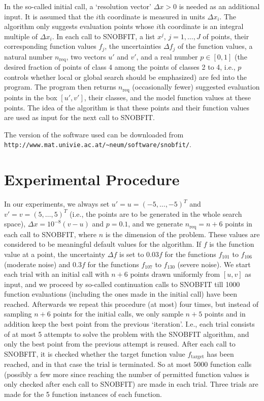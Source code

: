 \documentclass{sig-alternate}
\begin{document}
In the so-called
initial call, a `resolution vector' $\Delta x >0$ is needed as an additional input. It
is assumed that the $i$th coordinate is measured in units $\Delta x_i$. The algorithm
only suggests evaluation points whose $i$th coordinate is an integral multiple of
$\Delta x_i$. In each call to SNOBFIT, a list $x^j$, $j=1,\dots,J$ of points, their
corresponding function values $f_j$, the uncertainties $\Delta f_j$ of the function
values, a natural number $n_\text{req}$, two vectors $u'$ and $v'$, and a real number
$p \in [0,1]$ (the desired fraction of points of class 4 among the points of 
classes 2 to 4, i.e., $p$ controls whether local or global search should be 
emphasized) are fed into the program. The program then returns $n_\text{req}$
(occasionally fewer) suggested evaluation points in the box $[u',v']$, their classes,
and the model function values at these points. The idea of the algorithm is that
these points and their function values are used as input for the next call to
SNOBFIT.

The version of the software used can be downloaded from
\verb|http://www.mat.univie.ac.at/~neum/software/snobfit/|.
 
\section{Experimental Procedure}
%
In our experiments, we always set $u'=u=(-5,\dots,-5)^T$ and $v'=v=(5,\dots,5)^T$
(i.e., the points are to be generated in the whole search space), $\Delta x = 
10^{-8}(v-u)$ and $p=0.1$, and we generate $n_\text{req} = n+6$ points in each
call to SNOBFIT, where $n$ is the dimension of the problem. These values are 
considered to be meaningful default values for the algorithm. If $f$ is the function
value at a point, the uncertainty $\Delta f$ is set to $0.03f$ for the functions
$f_{101}$ to $f_{106}$ (moderate noise) and $0.3f$ for the functions $f_{107}$ to
$f_{130}$ (severe noise). We start each trial with an initial call with $n+6$ 
points drawn uniformly from $[u,v]$ as input, and we proceed by so-called
continuation calls to SNOBFIT till 1000 function evaluations (including the ones
made in the initial call) have been reached. Afterwards we repeat this procedure
(at most) four times, but instead of sampling $n+6$ points for the initial calls,
we only sample $n+5$ points and in addition keep the best point from the previous
`iteration'. I.e., each trial consists of at most 5 attempts to solve the
problem with the SNOBFIT algorithm, and only the best point from the previous
attempt is reused. After each call to SNOBFIT, it is checked whether the
target function value $f_\text{target}$ has been reached, and in that case the
trial is terminated. So at most 5000 function calls (possibly a few more since 
reaching the number of permitted function values is only checked after each call
to SNOBFIT) are made in each trial.
Three trials are made for the 5 function instances of each function.
\end{document}

